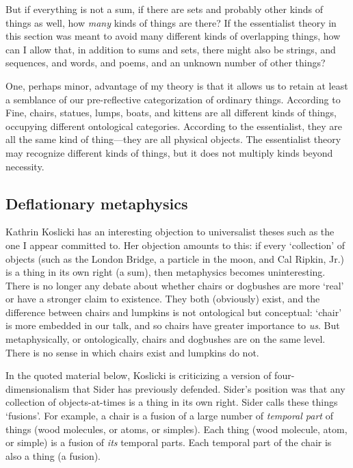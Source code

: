\documentclass[11pt]{article}
\begin{document}
\begin{spacing}{1.5}
But if everything is not a sum, if there are sets and probably other
kinds of things as well, how {\em many} kinds of things are there?  If
the essentialist theory in this section was meant to avoid many
different kinds of overlapping things, how can I allow that, in
addition to sums and sets, there might also be strings, and sequences,
and words, and poems, and an unknown number of other things?

One, perhaps minor, advantage of my theory is that it allows us to
retain at least a semblance of our pre-reflective categorization of
ordinary things.  According to Fine, chairs, statues, lumps, boats,
and kittens are all different kinds of things, occupying different
ontological categories.  According to the essentialist, they are all
the same kind of thing---they are all physical objects.  The
essentialist theory may recognize different kinds of things, but it
does not multiply kinds beyond necessity.

\subsection{Deflationary metaphysics}
\label{deflate}
Kathrin Koslicki has an interesting objection to universalist theses
such as the one I appear committed to.  Her objection amounts to this:
if every `collection' of objects (such as the London Bridge, a
particle in the moon, and Cal Ripkin, Jr.) is a thing in its own right
(a sum), then metaphysics becomes uninteresting.  There is no longer
any debate about whether chairs or dogbushes are more `real' or have a
stronger claim to existence.  They both (obviously) exist, and the
difference between chairs and lumpkins is not ontological but
conceptual: `chair' is more embedded in our talk, and so chairs have
greater importance to {\em us}.  But metaphysically, or ontologically,
chairs and dogbushes are on the same level.  There is no sense in
which chairs exist and lumpkins do not.

In the quoted material below, Koslicki is criticizing a version of
four-dimensionalism that Sider has previously defended.  Sider's
position was that any collection of objects-at-times is a thing in its
own right.  Sider calls these things `fusions'.  For example, a chair
is a fusion of a large number of {\em temporal part} of things (wood
molecules, or atoms, or simples).  Each thing (wood molecule, atom, or
simple) is a fusion of {\em its} temporal parts.  Each temporal part
of the chair is also a thing (a fusion).


\end{spacing}
\end{document}
